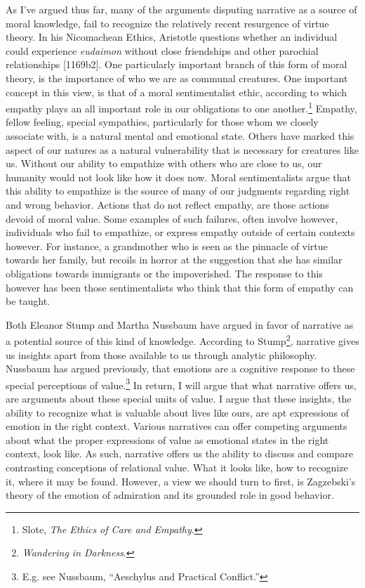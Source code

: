 \documentclass[phdthesis,12pt,final,a4paper]{wuthesis}
\theoremstyle{definition}
\theoremstyle{definition}
\theoremstyle{definition}
\theoremstyle{definition}
\theoremstyle{remark}
\begin{document}
As I've argued thus far, many of the arguments disputing narrative as a source of moral knowledge, fail to recognize the relatively recent resurgence of virtue theory. In his Nicomachean Ethics, Aristotle questions whether an individual could experience \emph{eudaimon} without close friendships and other parochial relationships {[}1169b2{]}. One particularly important branch of this form of moral theory, is the importance of who we are as communal creatures. One important concept in this view, is that of a moral sentimentalist ethic, according to which empathy plays an all important role in our obligations to one another.\footnote{Slote, \emph{The {Ethics} of {Care} and {Empathy}}.} Empathy, fellow feeling, special sympathies, particularly for those whom we closely associate with, is a natural mental and emotional state. Others have marked this aspect of our natures as a natural vulnerability that is necessary for creatures like us. Without our ability to empathize with others who are close to us, our humanity would not look like how it does now. Moral sentimentalists argue that this ability to empathize is the source of many of our judgments regarding right and wrong behavior. Actions that do not reflect empathy, are those actions devoid of moral value. Some examples of such failures, often involve however, individuals who fail to empathize, or express empathy outside of certain contexts however. For instance, a grandmother who is seen as the pinnacle of virtue towards her family, but recoils in horror at the suggestion that she has similar obligations towards immigrants or the impoverished. The response to this however has been those sentimentalists who think that this form of empathy can be taught.

Both Eleanor Stump and Martha Nussbaum have argued in favor of narrative as a potential source of this kind of knowledge. According to Stump\footnote{\emph{Wandering in {Darkness}}.}, narrative gives us insights apart from those available to us through analytic philosophy. Nussbaum has argued previously, that emotions are a cognitive response to these special perceptions of value.\footnote{E.g. see Nussbaum, {``Aeschylus and Practical Conflict.''}} In return, I will argue that what narrative offers us, are arguments about these special units of value. I argue that these insights, the ability to recognize what is valuable about lives like ours, are apt expressions of emotion in the right context. Various narratives can offer competing arguments about what the proper expressions of value as emotional states in the right context, look like. As such, narrative offers us the ability to discuss and compare contrasting conceptions of relational value. What it looks like, how to recognize it, where it may be found. However, a view we should turn to first, is Zagzebski's theory of the emotion of admiration and its grounded role in good behavior.
\end{document}
